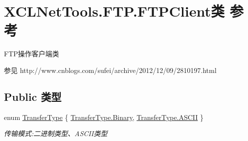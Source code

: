 \hypertarget{class_x_c_l_net_tools_1_1_f_t_p_1_1_f_t_p_client}{\section{X\-C\-L\-Net\-Tools.\-F\-T\-P.\-F\-T\-P\-Client类 参考}
\label{class_x_c_l_net_tools_1_1_f_t_p_1_1_f_t_p_client}
}


F\-T\-P操作客户端类 \begin{DoxySeeAlso}{参见}
http\-://www.\-cnblogs.\-com/sufei/archive/2012/12/09/2810197.\-html


\end{DoxySeeAlso}
 


\subsection*{Public 类型}
\begin{DoxyCompactItemize}
\item 
enum \hyperlink{class_x_c_l_net_tools_1_1_f_t_p_1_1_f_t_p_client_adef28404af1c916d9bd2bfbfa924b707}{Transfer\-Type} \{ \hyperlink{class_x_c_l_net_tools_1_1_f_t_p_1_1_f_t_p_client_adef28404af1c916d9bd2bfbfa924b707a6ce976e8f061b2b5cfe4d0c50c3405dd}{Transfer\-Type.\-Binary}, 
\hyperlink{class_x_c_l_net_tools_1_1_f_t_p_1_1_f_t_p_client_adef28404af1c916d9bd2bfbfa924b707ad2cd8253361a9c732d21ca1d336599cc}{Transfer\-Type.\-A\-S\-C\-I\-I}
 \}
\begin{DoxyCompactList}\small\item\em 传输模式\-:二进制类型、\-A\-S\-C\-I\-I类型 \end{DoxyCompactList}\end{DoxyCompactItemize}
